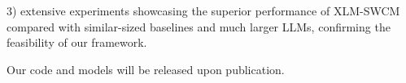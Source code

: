3) extensive experiments showcasing the superior performance of XLM-SWCM compared with similar-sized baselines and much larger LLMs, confirming the feasibility of our framework.

Our code and models will be released upon publication.





